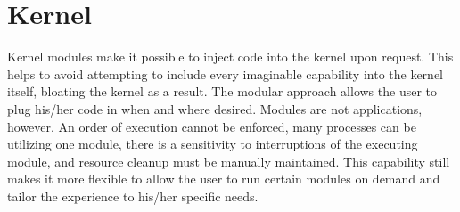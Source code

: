 \section{Kernel}
Kernel modules make it possible to inject code into the kernel upon request. This helps to avoid attempting to include every imaginable capability into the kernel itself, bloating the kernel as a result. The modular approach allows the user to plug his/her code in when and where desired. Modules are not applications, however. An order of execution cannot be enforced, many processes can be utilizing one module, there is a sensitivity to interruptions of the executing module, and resource cleanup must be manually maintained. This capability still makes it more flexible to allow the user to run certain modules on demand and tailor the experience to his/her specific needs. \cite{kernelmodule}